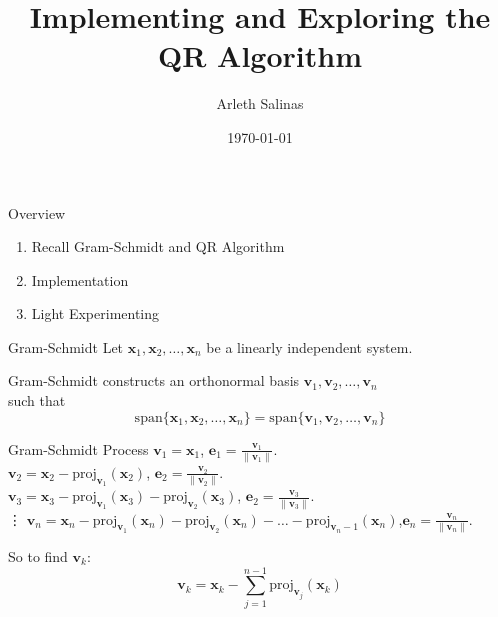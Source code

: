 \documentclass{beamer}
\title[Implementing and Exploring the QR Algorithm]{Implementing and Exploring the QR Algorithm}
\author[A.Salinas]{Arleth Salinas}
\date[2021]{\today}
\begin{document}
\begin{frame}
\titlepage
\end{frame}


\begin{frame}{Overview}

\begin{enumerate}
\item Recall Gram-Schmidt and QR Algorithm
\item Implementation
\item Light Experimenting
\end{enumerate}

\end{frame}

\begin{frame}{Gram-Schmidt}
Let $\mathbf{x}_1, \mathbf{x}_2, \ldots, \mathbf{x}_n$ be a linearly independent system.

Gram-Schmidt constructs an orthonormal basis $\mathbf{v}_1, \mathbf{v}_2, \ldots, \mathbf{v}_n$ 
\\ such that
$$\text{span}\{\mathbf{x}_1, \mathbf{x}_2, \ldots, \mathbf{x}_n\}= \text{span}\{\mathbf{v}_1, \mathbf{v}_2, \ldots, \mathbf{v}_n\}$$

\begin{block}{Gram-Schmidt Process}
$\mathbf{v}_1= \mathbf{x}_1$, $\mathbf{e}_1 = \frac{\mathbf{v}_1}{\|\mathbf{v}_1\|}$.
\\
$\mathbf{v}_2 = \mathbf{x}_2 - \text{proj}_{\mathbf{v}_1}(\mathbf{x}_2)$, $\mathbf{e}_2 = \frac{\mathbf{v}_2}{\|\mathbf{v}_2\|}$.
\\
$\mathbf{v}_3 = \mathbf{x}_3 - \text{proj}_{\mathbf{v}_1}(\mathbf{x}_3) - \text{proj}_{\mathbf{v}_2}(\mathbf{x}_3)$, $\mathbf{e}_2 = \frac{\mathbf{v}_3}{\|\mathbf{v}_3\|}$.
\\
\vdots
$\mathbf{v}_n = \mathbf{x}_n - \text{proj}_{\mathbf{v}_1}(\mathbf{x}_n) - \text{proj}_{\mathbf{v}_2}(\mathbf{x}_n)- \ldots - \text{proj}_{\mathbf{v}_n-1}(\mathbf{x}_n)$,$\mathbf{e}_n = \frac{\mathbf{v}_n}{\|\mathbf{v}_n\|}$.
\end{block}

So to find $\mathbf{v}_k$:
$$\mathbf{v}_k = \mathbf{x}_k - \sum_{j=1}^{n-1}\text{proj}_{\mathbf{v}_j}(\mathbf{x}_k)$$
\end{frame}
\end{document}
